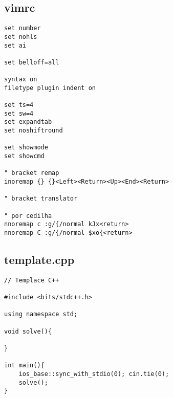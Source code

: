 \documentclass[11pt, a4paper, twoside]{article}
\begin{document}
\subsection{vimrc}
\begin{lstlisting}
set number
set nohls
set ai

set belloff=all

syntax on
filetype plugin indent on

set ts=4
set sw=4
set expandtab
set noshiftround

set showmode
set showcmd

" bracket remap
inoremap {} {}<Left><Return><Up><End><Return> 

" bracket translator

" por cedilha
nnoremap c :g/{/normal kJx<return>
nnoremap C :g/{/normal $xo{<return>
\end{lstlisting}

\subsection{template.cpp}
\begin{lstlisting}
// Templace C++

#include <bits/stdc++.h>

using namespace std;

void solve(){

}

int main(){
	ios_base::sync_with_stdio(0); cin.tie(0);
	solve();
}
\end{lstlisting}
\end{document}
